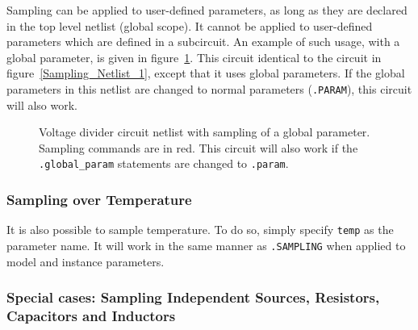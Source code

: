 Sampling can be applied to user-defined parameters, as long as they are declared in the top level netlist (global scope).  
It cannot be applied to user-defined parameters which are defined in a subcircuit.  An example of such usage, with a global parameter, is given 
in figure~\ref{Sampling_Netlist_3}. This circuit identical to the circuit in 
figure~\ref{Sampling_Netlist_1}, except that it uses global parameters.  
If the global parameters in this netlist are changed to normal parameters (\texttt{.PARAM}), this circuit will also work.
\begin{figure}[htbp]
  \fontsize{9pt}{10pt}
\begin{centering}
\caption{Voltage divider circuit netlist with sampling of a global parameter.
  Sampling commands are in \color{XyceRed}red\color{black}.  This circuit will also work if the \texttt{.global\_param} statements are changed to \texttt{.param}.
\label{Sampling_Netlist_3}}
\end{centering}
\end{figure}

\subsubsection{Sampling over Temperature}
\label{sampling_Temperature}

It is also possible to sample temperature.  To do so, simply 
specify \verb|temp| as the parameter name.  It will work in the 
same manner as \verb|.SAMPLING| when applied to model and instance 
parameters.

\subsubsection{Special cases: Sampling Independent Sources, Resistors, Capacitors and Inductors}
\label{sampling_SpecialCases}

